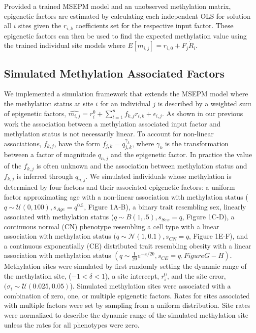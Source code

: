 \documentclass{article}
\begin{document}
{\begin{linenumbers}
Provided a trained MSEPM model and an unobserved methylation matrix, epigenetic factors are estimated by 
calculating each independent OLS for solution all $i$ sites given the $r_{i,k}$ coefficients set for the 
respective input factor.  These epigenetic factors can then be used to find the expected methylation value using the 
trained individual site models where $E[m_{i,j}] = r_{i,0} + F_{j} \dot R_{i}$. 


\subsection{Simulated Methylation Associated Factors}

We implemented a simulation framework that extends the MSEPM model where the methylation status at site $i$ for an 
individual $j$ is described by a weighted sum of epigenetic factors, 
$\hat{m_{i,j}} = r^0_i + \sum^n_{l=1} f_{k,j} r_{i,k} + \epsilon_{i,j}$. As shown in our 
previous work \cite{Snir2019-ii} the association between a methylation associated input factor and methylation 
status is not necessarily linear. To account for non-linear associations, $f_{k,j}$, have the 
form $f_{j,k} =  q_{j,k}^{\gamma_{k}}$, where $\gamma_{k}$ is the transformation between a factor of 
magnitude $q_{n,j}$ and the epigenetic factor. In practice the value of the $f_{k,j}$ is often unknown and the 
association between methylation status and $f_{k,j}$ is inferred through $q_{n,j}$. We simulated individuals 
whose methylation is determined by four factors and their associated epigenetic factors: a uniform factor 
approximating age with a non-linear association with methylation status 
($q \sim\mathcal{U}(0,100), s_{Age}=q^{0.5}$, Figure 1A-B), a binary trait resembling sex, 
linearly associated with methylation status ($q \sim B(1,.5), s_{Sex}=q$, Figure 1C-D), a continuous normal 
(CN) phenotype resembling a cell type with a linear association with methylation 
status $(q \sim\mathcal{N}(1, 0.1), s_{CN}=q$, Figure 1E-F), and a continuous exponentially (CE) distributed trait 
resembling obesity with a linear association with methylation status 
$(q \sim \frac{1}{20}e^{-x/20}, s_{CE}=q, Figure G-H)$. Methylation sites were simulated by first randomly 
setting the dynamic range of the methylation site, ($ -1< \delta < 1$), a site intercept, $r^0_i$, and the 
site error, $(\sigma_i \sim \mathcal{U}(0.025, 0.05)$). Simulated methylation sites were associated with a 
combination of zero, one, or multiple epigenetic factors. Rates for sites associated with multiple factors were 
set by sampling from a uniform distribution. Site rates were normalized to describe the dynamic range of the 
simulated methylation site unless the rates for all phenotypes were zero. 


\end{linenumbers}}
\end{document}
